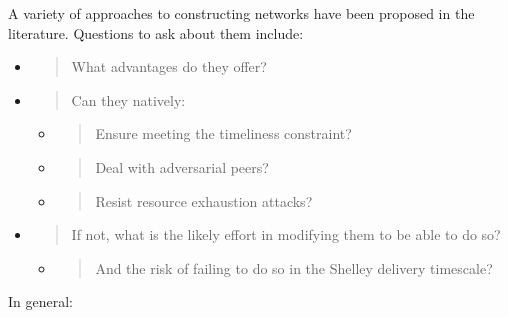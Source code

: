 \documentclass[]{article}
\begin{document}
A variety of approaches to constructing networks have been proposed in
the literature. Questions to ask about them include:

\begin{itemize}
\item
  \begin{quote}
  What advantages do they offer?
  \end{quote}
\item
  \begin{quote}
  Can they natively:
  \end{quote}

  \begin{itemize}
  \item
    \begin{quote}
    Ensure meeting the timeliness constraint?
    \end{quote}
  \item
    \begin{quote}
    Deal with adversarial peers?
    \end{quote}
  \item
    \begin{quote}
    Resist resource exhaustion attacks?
    \end{quote}
  \end{itemize}
\item
  \begin{quote}
  If not, what is the likely effort in modifying them to be able to do
  so?
  \end{quote}

  \begin{itemize}
  \item
    \begin{quote}
    And the risk of failing to do so in the Shelley delivery timescale?
    \end{quote}
  \end{itemize}
\end{itemize}

In general:
\end{document}
